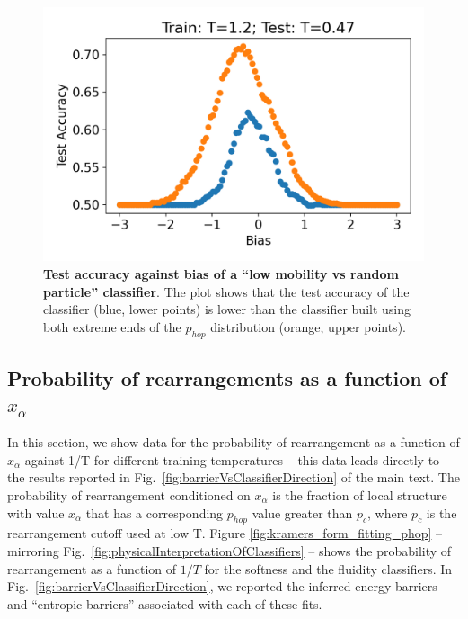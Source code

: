 \documentclass[aps,reprint,superscriptaddress,nofootinbib, notitlepage,prl]{revtex4-2}
\begin{document}
\begin{figure}[ht]
\centering
    \includegraphics[width =1.0\linewidth]{SM_RandomStucture.png}
    \caption{\textbf{Test accuracy against bias of a ``low mobility vs random particle'' classifier}. The plot shows that the test accuracy of the classifier (blue, lower points) is lower than the classifier built using both extreme ends of the $p_{hop}$ distribution (orange, upper points).}
    \label{fig:extremecheck_bias}
\end{figure}

 

\subsection{Probability of rearrangements as a function of $x_{\alpha}$} \label{sec:PofR}

In this section, we show  data for the probability of rearrangement as a function of $x_{\alpha}$ against 1/T for different training temperatures -- this data leads directly to the results reported in Fig.~\ref{fig:barrierVsClassifierDirection} of the main text. The probability of rearrangement conditioned on $x_{\alpha}$ is the fraction of local structure with value $x_{\alpha}$ that has a corresponding $p_{hop}$ value greater than $p_c$, where $p_c$ is the rearrangement cutoff used at low T. Figure \ref{fig:kramers_form_fitting_phop} -- mirroring Fig.~\ref{fig:physicalInterpretationOfClassifiers} -- shows the probability of rearrangement as a function of $1/T$ for the softness and the fluidity classifiers. In Fig.~\ref{fig:barrierVsClassifierDirection}, we reported the inferred energy barriers and ``entropic barriers'' associated with each of these fits.
\end{document}

